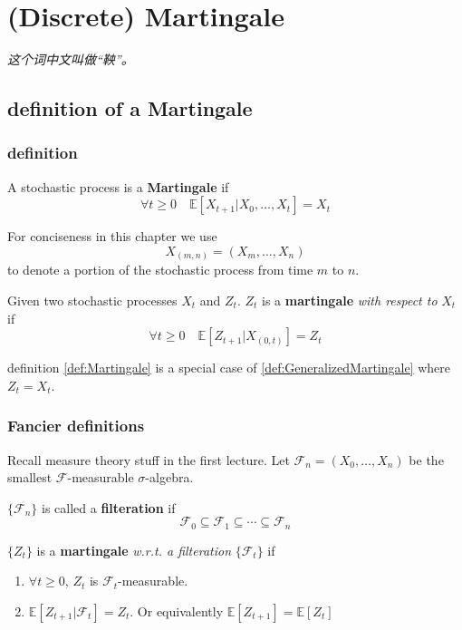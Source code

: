 \chapter{(Discrete) Martingale}
\emph{这个词中文叫做“鞅”。}
\newpage


\section{definition of a Martingale}
    \subsection{definition}
        \begin{definition}[Martingale]\label{def:Martingale}
            A stochastic process is a \textbf{Martingale} if
            \[ \forall t \ge 0 \quad \mathbb{E}[X_{t+1}|X_0,\dots,X_t] = X_t \]
        \end{definition}

        For conciseness in this chapter we use
        \[ X_{(m,n)} = (X_m,\dots,X_n) \]
        to denote a portion of the stochastic process from time $m$ to $n$.

        \begin{definition}\label{def:GeneralizedMartingale}
            Given two stochastic processes $X_t$ and $Z_t$. $Z_t$ is a \textbf{martingale} \emph{with respect to} $X_t$ if
            \[ \forall t \ge 0 \quad \mathbb{E}[Z_{t+1} | X_{(0,t)}] = Z_t \]
        \end{definition}
        \begin{remark}
            definition \ref{def:Martingale} is a special case of \ref{def:GeneralizedMartingale} where $Z_t = X_t$.
        \end{remark}

    \subsection{Fancier definitions}
        Recall measure theory stuff in the first lecture.
        Let $\mathcal{F}_n = (X_0,\dots,X_n)$ be the smallest $\mathcal{F}$-measurable $\sigma$-algebra.
        \begin{definition}[Filteration]
            $\{\mathcal{F}_n\}$ is called a \textbf{filteration} if
            \[ \mathcal{F}_0 \subseteq \mathcal{F}_1 \subseteq \cdots \subseteq \mathcal{F}_n \]
        \end{definition}

        \begin{definition}\label{def:FancyMartingale}
            $\{Z_t\}$ is a \textbf{martingale} \emph{w.r.t. a filteration} $\{\mathcal{F}_t\}$ if
            \begin{enumerate}
                \item $\forall t \ge 0$, $Z_t$ is $\mathcal{F}_t$-measurable.
                \item $\mathbb{E}[Z_{t+1}|\mathcal{F}_t] = Z_t$. Or equivalently $\mathbb{E}[Z_{t+1}] = \mathbb{E}[Z_t]$
            \end{enumerate}
        \end{definition}

